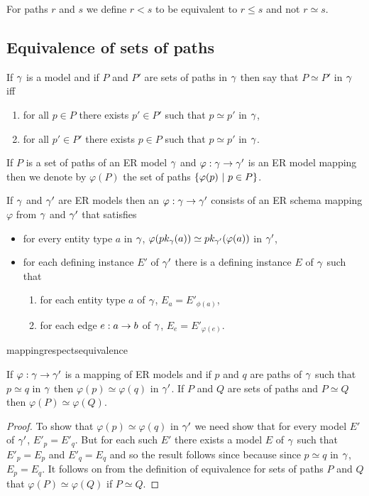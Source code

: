 \noindent For paths $r$ and $s$ we define $r < s$ to be equivalent to $r \leq s$ and not $r \simeq s$. \\

\subsection{Equivalence of sets of paths}
\begin{definition}
If $\gmodel$ is a model and if $P$ and $P'$ are sets of paths in $\gmodel$ then say that
$P \simeq P'$ in $\gmodel$ iff
\begin{enumerate}
\item for all $p \in P$ there exists $p' \in P'$ such that $p \simeq p'$ in $\gmodel$,
\item for all $p' \in P'$ there exists $p \in P$ such that $p \simeq p'$ in $\gmodel$.
\end{enumerate} 
\end{definition}

If $P$ is a set of paths of an ER model $\gmodel$ and $\varphi : \gmodel \morph \gmodel'$ is an ER model mapping then we denote by $\varphi(P)$ the set of paths
$\setsuchthat{\varphi(p)}{p \in P}$.

\begin{definition}
\label{ERmodelmapping}
If $\gmodel$ and  $\gmodel'$ are ER models then an 
$\varphi : \gmodel \morph \gmodel'$ consists of an ER schema mapping $\varphi$ from $\gmodel$ and  $\gmodel'$ that satisfies
\begin{itemize}
\item for every entity type $a$ in $\gmodel$, $\varphi(\pk{a}) \simeq \pk[\gmodel']{\varphi(a)}$
in $\gmodel'$,
\item  for each defining instance $E'$  of $\gmodel'$ there is a defining instance $E$ of $\gmodel$ such that
\begin{enumerate}
\item for each entity type $a$ of $\gmodel$, $E_a = E'_{\phi(a)}$,
\item for each edge $e:a \morph b$ of $\gmodel$, $E_e = E'_{\varphi(e)}$.
\end{enumerate} 
\end{itemize}
\end{definition}

mappingrespectsequivalence
\begin{lemma}
\label{mappingrespectsequivalence}
If $\varphi: \gmodel \morph \gmodel'$ is a mapping of ER models and
if $p$ and $q$ are paths of $\gmodel$ such that $p \simeq q$ in $\gmodel$ then $\varphi(p) \simeq \varphi(q)$ in $\gmodel'$. If $P$ and $Q$ are sets of paths and $P \simeq Q$ then $\varphi(P) \simeq \varphi(Q)$.
\end{lemma}
\begin{proof}
To show that $\varphi(p) \simeq \varphi(q)$ in $\gmodel'$ we need show that for every model $E'$ of $\gmodel'$, $E'_p=E'_q$. But for each such $E'$ there exists a model $E$ of $\gmodel$ such that $E'_p=E_p$ and $E'_q=E_q$ and so the result follows since because since $p\simeq q$ in $\gmodel$, $E_p=E_q$.
It follows on from the definition of equivalence for sets of paths $P$ and $Q$ that $\varphi(P) \simeq \varphi(Q)$ if $P \simeq Q$.
\end{proof}
